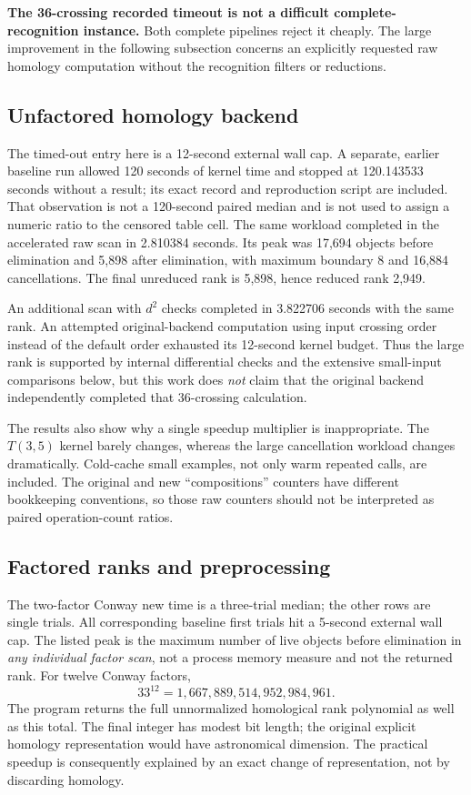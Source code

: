 \documentclass[11pt]{article}
\theoremstyle{definition}\newtheorem{definition}[theorem]{Definition}
\theoremstyle{remark}\newtheorem{remark}[theorem]{Remark}
\begin{document}
\textbf{The 36-crossing recorded timeout is not a difficult complete-recognition
instance.} Both complete pipelines reject it cheaply. The large improvement in
the following subsection concerns an explicitly requested raw homology
computation without the recognition filters or reductions.

\subsection{Unfactored homology backend}

The timed-out entry here is a 12-second external wall cap. A separate,
earlier baseline run allowed 120 seconds of kernel time and stopped at
120.143533 seconds without a result; its exact record and reproduction script
are included. That observation is not a 120-second paired median and is not
used to assign a numeric ratio to the censored table cell. The same workload
completed in the accelerated raw scan in 2.810384 seconds. Its peak was 17,694
objects before elimination and 5,898 after elimination, with maximum boundary
8 and 16,884 cancellations. The final unreduced rank is 5,898, hence reduced
rank 2,949.

An additional scan with $d^2$ checks completed in 3.822706 seconds with the same
rank. An attempted original-backend computation using input crossing order
instead of the default order exhausted its 12-second kernel budget. Thus the
large rank is supported by internal differential checks and the extensive
small-input comparisons below, but this work does \emph{not} claim that the
original backend independently completed that 36-crossing calculation.

The results also show why a single speedup multiplier is inappropriate.
The $T(3,5)$ kernel barely changes, whereas the large cancellation workload
changes dramatically. Cold-cache small examples, not only warm repeated calls,
are included. The original and new ``compositions'' counters have different
bookkeeping conventions, so those raw counters should not be interpreted as
paired operation-count ratios.

\subsection{Factored ranks and preprocessing}

The two-factor Conway new time is a three-trial median; the other rows are
single trials. All corresponding baseline first trials hit a 5-second external
wall cap. The listed peak is the maximum number of live objects before
elimination in \emph{any individual factor scan}, not a process memory measure
and not the returned rank. For twelve Conway factors,
\[
 33^{12}=1{,}667{,}889{,}514{,}952{,}984{,}961.
\]
The program returns the full unnormalized homological rank polynomial as well
as this total. The final integer has modest bit length; the original explicit
homology representation would have astronomical dimension. The practical
speedup is consequently explained by an exact change of representation, not
by discarding homology.
\end{document}

